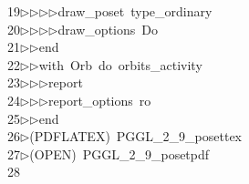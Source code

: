 \begin{tabbing}
19\>$\triangleright$\>$\triangleright$\>$\triangleright$\>$\triangleright$\>draw\_poset\ type\_ordinary\ \\[0pt]
20\>$\triangleright$\>$\triangleright$\>$\triangleright$\>$\triangleright$\>draw\_options\ Do\ \\[0pt]
21\>$\triangleright$\>$\triangleright$\>end\ \\[0pt]
22\>$\triangleright$\>$\triangleright$\>with\ Orb\ do\ orbits\_activity\ \\[0pt]
23\>$\triangleright$\>$\triangleright$\>$\triangleright$\>report\ \ \\[0pt]
24\>$\triangleright$\>$\triangleright$\>$\triangleright$\>report\_options\ ro\ \\[0pt]
25\>$\triangleright$\>$\triangleright$\>end\ \\[0pt]
26\>$\triangleright$\>(PDFLATEX)\ PGGL\_2\_9\_posettex\\[0pt]
27\>$\triangleright$\>(OPEN)\ PGGL\_2\_9\_posetpdf\\[0pt]
28\>\end{tabbing}
